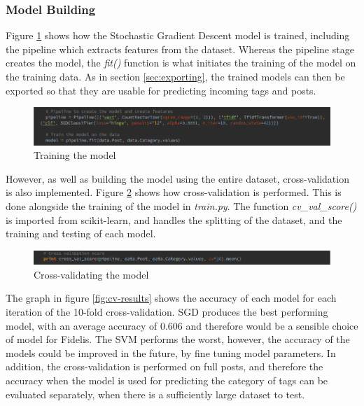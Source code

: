 \subsubsection{Model Building}
Figure \ref{fig:imp-content-train} shows how the Stochastic Gradient Descent model is trained, including the pipeline which extracts features from the dataset. Whereas the pipeline stage creates the model, the \textit{fit()} function is what initiates the training of the model on the training data. As in section \ref{sec:exporting}, the trained models can then be exported so that they are usable for predicting incoming tags and posts.

\begin{figure}[H]
\centering
\includegraphics[width=\textwidth]{Images/Implementation/content-train}
\caption{Training the model}
\label{fig:imp-content-train}
\end{figure}

However, as well as building the model using the entire dataset, cross-validation is also implemented. Figure \ref{fig:content-cv} shows how cross-validation is performed. This is done alongside the training of the model in \emph{train.py}. The function \textit{cv\_val\_score()} is imported from scikit-learn, and handles the splitting of the dataset, and the training and testing of each model.

\begin{figure}[H]
\centering
\includegraphics[width=\textwidth]{Images/Implementation/content-cv}
\caption{Cross-validating the model}
\label{fig:content-cv}
\end{figure}

The graph in figure \ref{fig:cv-results} shows the accuracy of each model for each iteration of the 10-fold cross-validation. SGD produces the best performing model, with an average accuracy of 0.606 and therefore would be a sensible choice of model for Fidelis. The SVM performs the worst, however, the accuracy of the models could be improved in the future, by fine tuning model parameters. In addition, the cross-validation is performed on full posts, and therefore the accuracy when the model is used for predicting the category of tags can be evaluated separately, when there is a sufficiently large dataset to test.

